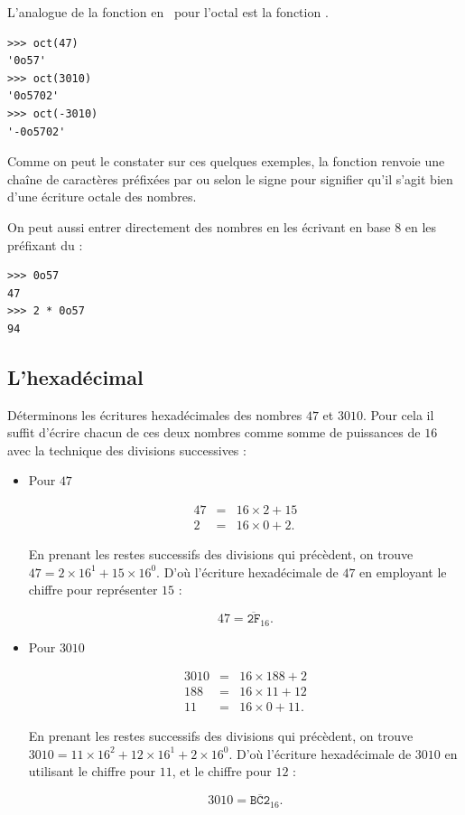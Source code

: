 \documentclass[class=report,crop=false]{standalone}
\begin{document}
L'analogue de la fonction  en \Python\ pour l'octal est la
fonction .
\begin{lstlisting}
>>> oct(47)
'0o57'
>>> oct(3010)
'0o5702'
>>> oct(-3010)
'-0o5702'  
\end{lstlisting}

Comme on peut le constater sur ces quelques exemples, la fonction
 renvoie une chaîne de caractères préfixées par 
ou  selon le signe pour signifier qu'il s'agit bien d'une
écriture octale des nombres.

On peut aussi entrer directement des nombres en les écrivant en base $8$
en les préfixant du  :
\begin{lstlisting}
>>> 0o57
47
>>> 2 * 0o57 
94 
\end{lstlisting}

\subsection{L'hexadécimal}

Déterminons les écritures hexadécimales des nombres $47$ et $3010$. Pour
cela il suffit d'écrire chacun de ces deux nombres comme somme de
puissances de $16$ avec la technique des divisions successives :

\begin{itemize}
\item Pour $47$

  \[\begin{array}{rcl}
  47 &=& 16\times 2 + 15\\
  2  &=& 16\times 0 + 2.
  \end{array}\]

  En prenant les restes successifs des divisions qui précèdent, on
  trouve $47 = 2\times 16^1 + 15\times 16^0$. D'où l'écriture
  hexadécimale de $47$ en employant le chiffre  pour représenter
  $15$ :

  \[47 = \overline{\mathtt{2F}}_{16}.\]
\item Pour $3010$

  \[\begin{array}{rcl}
  3010 &=& 16\times 188 + 2\\
  188  &=& 16\times 11 + 12\\
  11   &=& 16\times 0 + 11.
  \end{array}\]

  En prenant les restes successifs des divisions qui précèdent, on
  trouve $3010 = 11\times 16^2 + 12\times 16^1 + 2\times 16^0$. D'où
  l'écriture hexadécimale de $3010$ en utilisant le chiffre 
  pour $11$, et le chiffre  pour $12$ :

  \[3010 = \overline{\mathtt{BC2}}_{16}.\]
\end{itemize}
\end{document}
